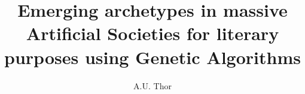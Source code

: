 \documentclass[runningheads]{llncs}
\begin{document}
\mainmatter  %




\title{Emerging archetypes in massive Artificial Societies for literary purposes using Genetic Algorithms}


\author{A.U. Thor}
%





\maketitle


\end{document}
